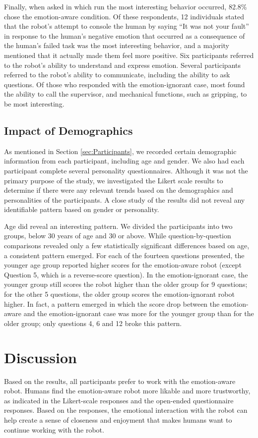 \documentclass[12pt]{report}
\begin{document}
Finally, when asked in which run the most interesting behavior occurred, 82.8\%
chose the emotion-aware condition. Of these respondents, 12 individuals stated
that the robot's attempt to console the human by saying ``It was not your
fault'' in response to the human's negative emotion that occurred as a
consequence of the human's failed task was the most interesting behavior, and a
majority mentioned that it actually made them feel more positive. Six
participants referred to the robot's ability to understand and express emotion.
Several participants referred to the robot's ability to communicate, including
the ability to ask questions. Of those who responded with the emotion-ignorant
case, most found the ability to call the supervisor, and mechanical functions,
such as gripping, to be most interesting.

\subsection{Impact of Demographics} 
As mentioned in Section \ref{sec:Participants}, we recorded certain demographic
information from each participant, including age and gender. We also had each
participant complete several personality questionnaires. Although it was not the
primary purpose of the study, we investigated the Likert scale results to
determine if there were any relevant trends based on the demographics and
personalities of the participants. A close study of the results did  not reveal
any identifiable pattern based on gender or personality.

Age did reveal an interesting pattern. We divided the participants into two
groups, below 30 years of age and 30 or above. While question-by-question
comparisons revealed only a few statistically significant differences based on
age, a consistent pattern emerged. For each of the fourteen questions presented,
the younger age group reported higher scores for the emotion-aware robot (except
Question 5, which is a reverse-score question). In the emotion-ignorant case,
the younger group still scores the robot higher than the older group for 9
questions; for the other 5 questions, the older group scores the
emotion-ignorant robot higher. In fact, a pattern emerged in which the score
drop between the emotion-aware and the emotion-ignorant case was more for the
younger group than for the older group; only questions 4, 6 and 12 broke this
pattern.

\vspace*{-2mm}
\section{Discussion}
Based on the results, all participants prefer to work with the emotion-aware
robot. Humans find the emotion-aware robot more likable and more trustworthy, as
indicated in the Likert-scale responses and the open-ended questionnaire
responses. Based on the responses, the emotional interaction with the robot can
help create a sense of closeness and enjoyment that makes humans want to
continue working with the robot.
\end{document}
